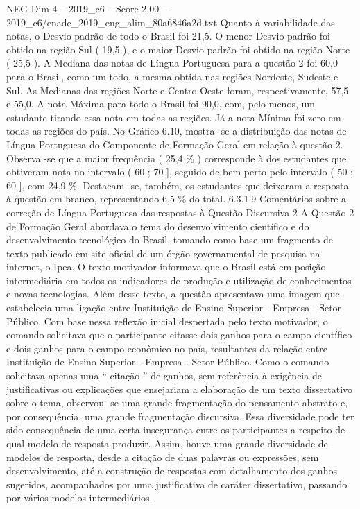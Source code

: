 \begin{textsample}{NEG Dim 4 – 2019\_c6 – Score 2.00 – 2019\_c6/enade\_2019\_eng\_alim\_80a6846a2d.txt}
Quanto à variabilidade das notas, o Desvio padrão de todo o Brasil foi 21,5.
O menor Desvio padrão foi obtido na região Sul ( 19,5 ), e o maior Desvio padrão foi obtido na região Norte ( 25,5 ).
A Mediana das notas de Língua Portuguesa para a questão 2 foi 60,0 para o Brasil, como um todo, a mesma obtida nas regiões Nordeste, Sudeste e Sul.
As Medianas das regiões Norte e Centro-Oeste foram, respectivamente, 57,5 e 55,0.
A nota Máxima para todo o Brasil foi 90,0, com, pelo menos, um estudante tirando essa nota em todas as regiões.
Já a nota Mínima foi zero em todas as regiões do país.
No Gráfico 6.10, mostra -se a distribuição das notas de Língua Portuguesa do Componente de Formação Geral em relação à questão 2.
Observa -se que a maior frequência ( 25,4 \% ) corresponde à dos estudantes que obtiveram nota no intervalo ( 60 ; 70 ], seguido de bem perto pelo intervalo ( 50 ; 60 ], com 24,9 \%.
Destacam -se, também, os estudantes que deixaram a resposta à questão em branco, representando 6,5 \% do total. 6.3.1.9 Comentários sobre a correção de Língua Portuguesa das respostas à Questão Discursiva 2 A Questão 2 de Formação Geral abordava o tema do desenvolvimento científico e do desenvolvimento tecnológico do Brasil, tomando como base um fragmento de texto publicado em site oficial de um órgão governamental de pesquisa na internet, o Ipea.
O texto motivador informava que o Brasil está em posição intermediária em todos os indicadores de produção e utilização de conhecimentos e novas tecnologias.
Além desse texto, a questão apresentava uma imagem que estabelecia uma ligação entre Instituição de Ensino Superior - Empresa - Setor Público.
Com base nessa reflexão inicial despertada pelo texto motivador, o comando solicitava que o participante citasse dois ganhos para o campo científico e dois ganhos para o campo econômico no país, resultantes da relação entre Instituição de Ensino Superior - Empresa - Setor Público.
Como o comando solicitava apenas uma “ citação ” de ganhos, sem referência à exigência de justificativas ou explicações que ensejariam a elaboração de um texto dissertativo sobre o tema, observou -se uma grande fragmentação do pensamento abstrato e, por consequência, uma grande fragmentação discursiva.
Essa diversidade pode ter sido consequência de uma certa insegurança entre os participantes a respeito de qual modelo de resposta produzir.
Assim, houve uma grande diversidade de modelos de resposta, desde a citação de duas palavras ou expressões, sem desenvolvimento, até a construção de respostas com detalhamento dos ganhos sugeridos, acompanhados por uma justificativa de caráter dissertativo, passando por vários modelos intermediários.

\end{textsample}
